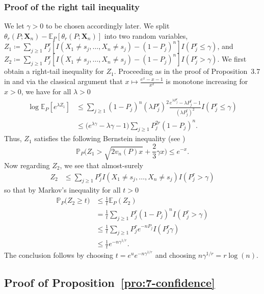 \documentclass{article}
\newcommand{\1}{\boldsymbol{1}}
\newcommand{\EE}{\mathbb{E}}
\newcommand{\PP}{\mathbb{P}}
\theoremstyle{plain}
\begin{document}
\subsubsection{Proof of the right tail inequality}

  We let $\gamma > 0$ to be chosen accordingly later. We split $\theta_r(P;\mathbf{X}_n) - \EE_P[\theta_r(P;\mathbf{X}_n)]$ into two random variables, $Z_1 \coloneqq \sum_{j\geq 1}P_j^r[I(X_1\ne s_j,\dots,X_n\ne s_j) - (1-P_j)^n]I(P_j^r \leq \gamma)$, and $Z_2 \coloneqq \sum_{j\geq 1}P_j^r[I(X_1\ne s_j,\dots,X_n\ne s_j) - (1-P_j)^n]I(P_j^r > \gamma)$. We first obtain a right-tail inequality for $Z_1$. Proceeding as in the proof of Proposition~3.7 in \cite{Ben(17)} and via the classical argument that $x \mapsto \frac{e^x - x - 1}{x^2}$ is monotone increasing for $x > 0$, we have for all $\lambda > 0$
  \begin{align*}
    \log\EE_P[e^{\lambda Z_1}]%
    &\leq \sum_{j\geq 1}(1 - P_j)^n (\lambda P_j^{r})^2\frac{e^{\lambda P_j^r} - \lambda P_j^r - 1}{(\lambda P_j^r)^2}I(P_j^r \leq \gamma)\\
    &\leq \big(e^{\lambda \gamma} - \lambda \gamma - 1 \big)%
      \sum_{j\geq 1} P_j^{2r}(1 - P_j)^n.
  \end{align*}
  Thus, $Z_1$ satisfies the following Bernstein inequality (see \cite{BLM(13)})
  \begin{equation*}
    \PP_P\Big(Z_1 > \sqrt{2 v_n(P) x} + \frac{2}{3}\gamma x \Big) \leq e^{-x}.
  \end{equation*}
  Now regarding $Z_2$, we see that almost-surely
  \begin{align*}
    Z_2%
    &\leq \sum_{j\geq 1}P_j^rI(X_1\ne s_j,\dots,X_n\ne s_j)I( P_j^r > \gamma)
  \end{align*}
  so that by Markov's inequality for all $t > 0$
  \begin{align*}
    \PP_P\big(Z_2 \geq t\big)%
    &\leq \frac{1}{t}\EE_P(Z_2)\\%
    &= \frac{1}{t}\sum_{j\geq 1}P_j^r(1-P_j)^nI(P_j^r > \gamma)\\
    &\leq \frac{1}{t}\sum_{j\geq 1}P_j^r e^{-nP_j}I( P_j^r \gamma)\\
    &\leq \frac{1}{t}e^{-n\gamma^{1/r}}.
  \end{align*}
  The conclusion follows by choosing $t = e^{u}e^{-n\gamma^{1/r}}$ and choosing $n\gamma^{1/r} = r \log(n)$.




\subsection{Proof of Proposition~\ref{pro:7-confidence}}
\label{sec:proof-pro:confidence}
\end{document}
